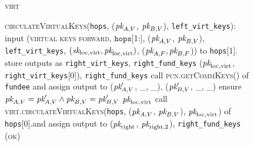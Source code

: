\begin{figure}[H]
\begin{processbox}{\textsc{virt}}
\begin{algorithmic}[1]
      \State \textsc{circulateVirtualKeys}(\texttt{hops}, ($\textit{pk}_{A, V}$, $\textit{pk}_{B,
      V}$), \texttt{left\_virt\_keys}):
      \Indent
        \State {}
         
           
            \State input (\textsc{virtual keys forward}, $\texttt{hops}$[1:],
            ($\textit{pk}_{A, V}$, $\textit{pk}_{B, V}$), \texttt{left\_virt\_keys},
            $(\textit{sk}_{\mathrm{loc}, \mathrm{virt}}, \textit{pk}_{\mathrm{loc},
            \mathrm{virt}})$, ($\textit{pk}_{A, F}, \textit{pk}_{B, F}$)) to
            \texttt{hops}[1].\alice{} 
            \State {}
            \State {}
            \State {}
            \State store outputs as \texttt{right\_virt\_keys},
            \texttt{right\_fund\_keys}
            \State \Return ($\textit{pk}_{\mathrm{loc}, \mathrm{virt}}$,
            \texttt{right\_virt\_keys}[0]),
            \texttt{right\_fund\_keys}
          \Else \: 
            \State {}
            \State call \textsc{pcn.getCommKeys}() of \texttt{fundee} and assign
            output to ($\textit{pk}_{A, V}'$, \_, \_), ($\textit{pk}_{B, V}'$, \_, \_)
            \State ensure $\textit{pk}_{A, V} = \textit{pk}_{A, V}' \wedge \textit{pk}_{B, V} = \textit{pk}_{B, V}'$
            \State \Return $\textit{pk}_{\mathrm{loc}, \mathrm{virt}}$
          \EndIf
        \Else \: 
          \State call \textsc{virt.circulateVirtualKeys}(\texttt{hops}, ($\textit{pk}_{A,
          V}$, $\textit{pk}_{B, V}$), $\textit{pk}_{\mathrm{loc}, \mathrm{virt}}$) of
          \texttt{hops}[0].\bob and assign output to ($\textit{pk}_{\mathrm{right}}$,
          $\textit{pk}_{\mathrm{right}, 2}$), \texttt{right\_fund\_keys}
          \State \Return (\textsc{ok})
        \EndIf
      \EndIndent
    \end{algorithmic}
  \end{processbox}
  \caption{}
  \label{code:virtual-layer:keys}
\end{figure}

